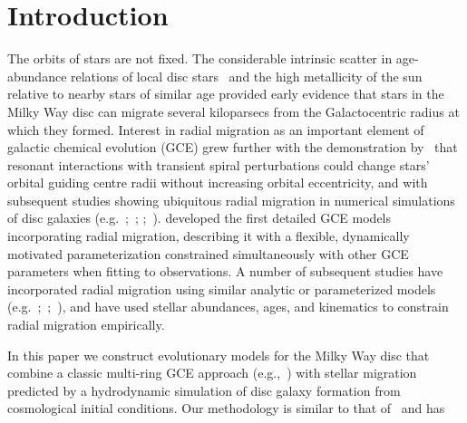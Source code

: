 
\section{Introduction}
\label{migration:sec:intro}

The orbits of stars are not fixed. The considerable intrinsic scatter in 
age-abundance relations of local disc stars~\citep{Edvardsson1993} and the high 
metallicity of the sun relative to nearby stars of similar age 
\citep*{Wielen1996} provided early evidence that stars in the Milky Way disc 
can migrate several kiloparsecs from the Galactocentric radius at which they 
formed. 
Interest in radial migration as an important element of galactic chemical 
evolution (GCE) grew further with the demonstration by~\citet{Sellwood2002} 
that resonant interactions with transient spiral perturbations could 
change stars' orbital guiding centre radii without increasing orbital 
eccentricity, and with subsequent studies showing ubiquitous radial migration 
in numerical simulations of disc galaxies (e.g.~\citealp{Roskar2008a, 
Roskar2008b, Loebman2011, Minchev2011};~\citealp*{Bird2012}; 
\citealp{Bird2013};~\citealp*{Grand2012a, Grand2012b, Kubryk2013}). 
\citet{Schoenrich2009a,Schoenrich2009b} developed the first detailed GCE 
models incorporating radial migration, describing it with a flexible, 
dynamically motivated parameterization constrained simultaneously with other 
GCE parameters when fitting to observations. A number of subsequent studies 
have incorporated radial migration using similar analytic or parameterized 
models (e.g.~\citealp{Bilitewski2012, Hayden2015};~\citealp*{Kubryk2015a, 
Kubryk2015b};~\citealp{Feuillet2018, Sharma2021}), and 
\citet{Frankel2018, Frankel2019, Frankel2020} have used stellar abundances, 
ages, and kinematics to constrain radial migration empirically. 
\par 
In this paper we construct evolutionary models for the Milky Way disc that 
combine a classic multi-ring GCE approach (e.g.,~\citealp{Matteucci1989, 
Wyse1989, Prantzos1995}) with stellar migration predicted by a 
hydrodynamic simulation of disc galaxy formation from cosmological initial 
conditions. 
Our methodology is similar to that of~\citet*{Minchev2013, Minchev2014} and has 
